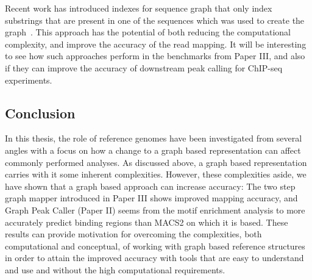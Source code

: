 Recent work has introduced indexes for sequence graph that only index substrings that are present in one of the sequences which was used to create the graph~\cite{haplotypeaware}.
This approach has the potential of both reducing the computational complexity, and improve the accuracy of the read mapping.
It will be interesting to see how such approaches perform in the benchmarks from Paper III, and also if they can improve the accuracy of downstream peak calling for ChIP-seq experiments.

\subsection{Conclusion}
In this thesis, the role of reference genomes have been investigated from several angles with a focus on how a change to a graph based representation can affect commonly performed analyses.
As discussed above, a graph based representation carries with it some inherent complexities.
However, these complexities aside, we have shown that a graph based approach can increase accuracy: The two step graph mapper introduced in Paper III shows improved mapping accuracy, and Graph Peak Caller (Paper II) seems from the motif enrichment analysis to more accurately predict binding regions than MACS2 on which it is based.
These results can provide motivation for overcoming the complexities, both computational and conceptual, of working with graph based reference structures in order to attain the improved accuracy with tools that are easy to understand and use and without the high computational requirements.

